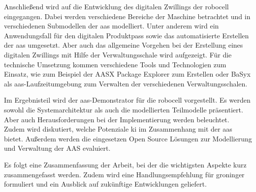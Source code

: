 Anschließend wird auf die Entwicklung des digitalen Zwillings der robocell eingegangen. 
Dabei werden verschiedene Bereiche der Maschine betrachtet und in verschiedenen Submodellen der \acs{aas} modelliert.
Unter anderem wird ein Anwendungsfall für den digitalen Produktpass sowie das automatisierte Erstellen der \acs{aas} umgesetzt.
Aber auch das allgemeine Vorgehen bei der Erstellung eines digitalen Zwillings mit Hilfe der Verwaltungsschale wird aufgezeigt.
Für die technische Umsetzung kommen verschiedene Tools und Technologien zum Einsatz, wie zum Beispiel der AASX Package Explorer zum Erstellen oder BaSyx als \acs{aas}-Laufzeitumgebung zum Verwalten der verschiedenen Verwaltungsschalen.


Im Ergebnisteil wird der \acs{aas}-Demonstrator für die robocell vorgestellt. Es werden sowohl die Systemarchitektur als auch die modellierten Teilmodelle präsentiert.
Aber auch Herausforderungen bei der Implementierung werden beleuchtet.
Zudem wird diskutiert, welche Potenziale \ac{ki} im Zusammenhang mit der \acs{aas} bietet.
Außerdem werden die eingesetzen Open Source Lösungen zur Modellierung und Verwaltung der AAS evaluiert.


Es folgt eine Zusammenfassung der Arbeit, bei der die wichtigsten Aspekte kurz zusammengefasst werden.
Zudem wird eine Handlungsempfehlung für groninger formuliert und ein Ausblick auf zukünftige Entwicklungen geliefert.